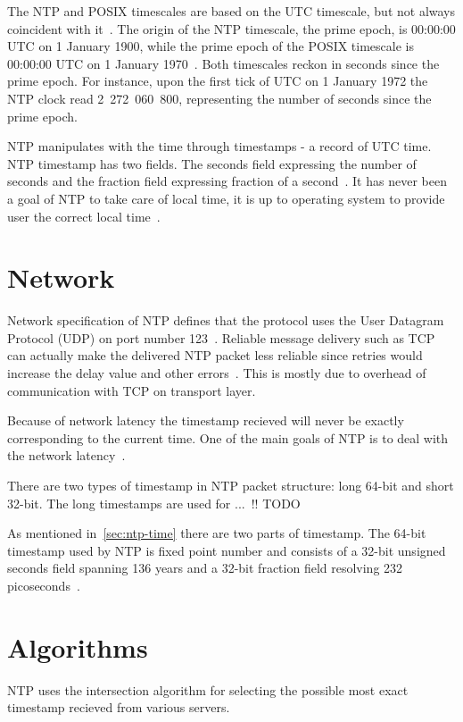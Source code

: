 The NTP and POSIX timescales are based on the UTC timescale,
but not always coincident with it~\cite{ntp-leap}.
The origin of the NTP timescale, the prime epoch, is 00:00:00 UTC on 1 January 1900,
while the prime epoch of the POSIX timescale is 00:00:00 UTC on 1 January 1970~\cite{ntp-leap}.
Both timescales reckon in seconds since the prime epoch.
For instance, upon the first tick of UTC on 1 January 1972 the NTP clock read 2~272~060~800,
representing the number of seconds since the prime epoch.

NTP manipulates with the time through timestamps - a record of UTC time.
NTP timestamp has two fields. The seconds field expressing the number of seconds
and the fraction field expressing fraction of a second~\cite{rfc5905}.
It has never been a goal of NTP to take care of local time,
it is up to operating system to provide user the correct local time~\cite{ntp-overview}.

\section{Network}\label{sec:ntp-network}
Network specification of NTP defines that
the protocol uses the User Datagram Protocol (UDP) on port number 123~\cite{rfc5905, ianna-ports}.
Reliable message delivery such as TCP can actually make the delivered NTP packet less reliable since retries
would increase the delay value and other errors~\cite{rfc5905}.
This is mostly due to overhead of communication with TCP on transport layer.

Because of network latency the timestamp recieved will never be exactly corresponding to
the current time.
One of the main goals of NTP is to deal with the network latency~\cite{ntp-overview}.

There are two types of timestamp in NTP packet structure:
long 64-bit and short 32-bit.
The long timestamps are used for ... \!!! TODO

As mentioned in~\ref{sec:ntp-time} there are two parts of timestamp.
The 64-bit timestamp used by NTP is fixed point number and consists of a 32-bit unsigned seconds
field spanning 136 years and a 32-bit fraction field resolving 232
picoseconds~\cite{rfc5905}.

\section{Algorithms}
NTP uses the intersection algorithm for selecting the possible most exact timestamp recieved
from various servers.
